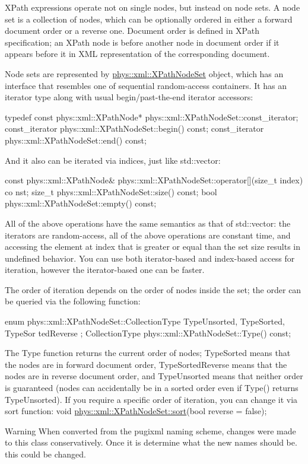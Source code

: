  \par
 XPath expressions operate not on single nodes, but instead on node sets. A node set is a collection of nodes, which can be optionally ordered in either a forward document order or a reverse one. Document order is defined in XPath specification; an XPath node is before another node in document order if it appears before it in XML representation of the corresponding document. \par
 \par
 Node sets are represented by \hyperlink{classphys_1_1xml_1_1XPathNodeSet}{phys::xml::XPathNodeSet} object, which has an interface that resembles one of sequential random-\/access containers. It has an iterator type along with usual begin/past-\/the-\/end iterator accessors: 
\begin{DoxyCode}
 typedef const phys::xml::XPathNode* phys::xml::XPathNodeSet::const_iterator;
 const_iterator phys::xml::XPathNodeSet::begin() const;
 const_iterator phys::xml::XPathNodeSet::end() const;
\end{DoxyCode}
 And it also can be iterated via indices, just like std::vector: 
\begin{DoxyCode}
 const phys::xml::XPathNode& phys::xml::XPathNodeSet::operator[](size_t index) co
      nst;
 size_t phys::xml::XPathNodeSet::size() const;
 bool phys::xml::XPathNodeSet::empty() const;
\end{DoxyCode}
 All of the above operations have the same semantics as that of std::vector: the iterators are random-\/access, all of the above operations are constant time, and accessing the element at index that is greater or equal than the set size results in undefined behavior. You can use both iterator-\/based and index-\/based access for iteration, however the iterator-\/based one can be faster. \par
 \par
 The order of iteration depends on the order of nodes inside the set; the order can be queried via the following function: 
\begin{DoxyCode}
 enum phys::xml::XPathNodeSet::CollectionType { TypeUnsorted, TypeSorted, TypeSor
      tedReverse };
 CollectionType phys::xml::XPathNodeSet::Type() const;
\end{DoxyCode}
 The Type function returns the current order of nodes; TypeSorted means that the nodes are in forward document order, TypeSortedReverse means that the nodes are in reverse document order, and TypeUnsorted means that neither order is guaranteed (nodes can accidentally be in a sorted order even if Type() returns TypeUnsorted). If you require a specific order of iteration, you can change it via sort function: void \hyperlink{classphys_1_1xml_1_1XPathNodeSet_a509bb7206dfc0fa79887c7ab7c5999db}{phys::xml::XPathNodeSet::sort}(bool reverse = false); \begin{DoxyWarning}{Warning}
When converted from the pugixml naming scheme, changes were made to this class conservatively. Once it is determine what the new names should be. this could be changed.
\end{DoxyWarning}
